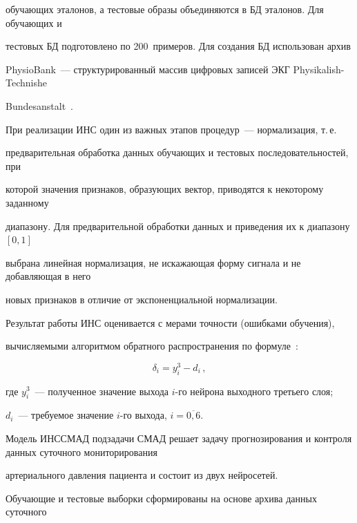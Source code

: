 обучающих эталонов, а тестовые образы объединяются в БД эталонов. Для обучающих и


тестовых БД подготовлено по 200~примеров. Для создания БД использован архив


PhysioBank~--- структурированный массив цифровых записей ЭКГ Physikalish-Technishe


Bundesanstalt~\cite{8-kir}.





 При реализации ИНС один из важных этапов процедур~--- нормализация, т.\,е.\


предварительная обработка данных обучающих и тестовых последовательностей, при


которой значения признаков, образующих вектор, приводятся к некоторому заданному


диапазону. Для предварительной обработки данных и приведения их к диапазону $[0, 1]$


выбрана линейная нормализация, не искажающая форму сигнала и не добавляющая в него


новых признаков в отличие от экспоненциальной нормализации.




 Результат работы ИНС оценивается с мерами точности (ошибками обучения),


вычисляемыми алгоритмом обратного распространения по формуле~\cite{6-kir}:


 \begin{equation}


 \delta_i=y_i^3-d_i\,,


 \label{e1-kir}


 \end{equation}


где $y_i^3$~--- полученное значение выхода $i$-го нейрона выходного третьего слоя;


$d_i$~--- требуемое значение $i$-го выхода, $i=\overline{0,6}$.





 Модель ИНССМАД подзадачи СМАД решает задачу прогнозирования и контроля данных суточного мониторирования


артериального давления пациента и состоит из двух нейросетей.





 Обучающие и тестовые выборки сформированы на основе архива данных суточного


